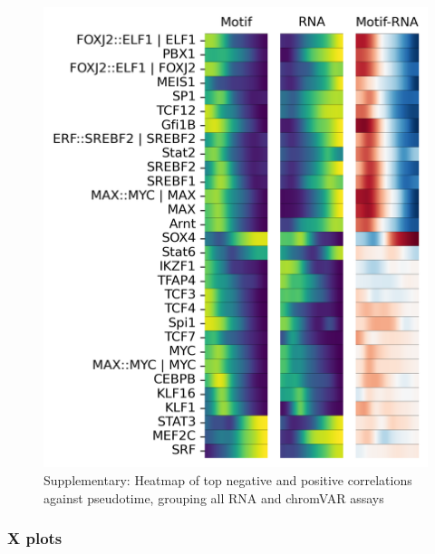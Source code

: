 \documentclass[a4paper]{article}
\begin{document}
\begin{figure}[!htb]
  \centering
  \includegraphics[width=\textwidth]{../figures/hematopoiesis/MKP_40_110_single_smooth_none_heatmap_grouped_assays.png}
  \caption{Supplementary: Heatmap of top negative and positive correlations against pseudotime, grouping all RNA and chromVAR assays}
\end{figure}

\FloatBarrier
\subsubsection{X plots}
 
\end{document}
